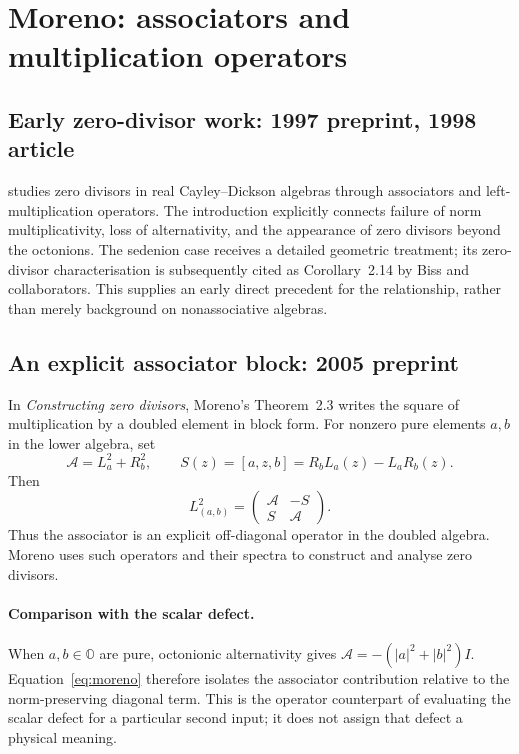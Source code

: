 \documentclass[11pt,a4paper]{article}
\newcommand{\OO}{\mathbb O}
\numberwithin{equation}{section}
\begin{document}
\section{Moreno: associators and multiplication operators}

\subsection{Early zero-divisor work: 1997 preprint, 1998 article}

\citet{Moreno1998ZeroDivisors} studies zero divisors in real
Cayley--Dickson algebras through associators and left-multiplication
operators. The introduction explicitly connects failure of norm
multiplicativity, loss of alternativity, and the appearance of zero
divisors beyond the octonions. The sedenion case receives a detailed
geometric treatment; its zero-divisor characterisation is subsequently
cited as Corollary~2.14 by Biss and collaborators.
This supplies an early direct precedent for the relationship, rather
than merely background on nonassociative algebras.
\citep{Moreno1998ZeroDivisors,BissDuggerIsaksen2008Annihilators}

\subsection{An explicit associator block: 2005 preprint}

In \emph{Constructing zero divisors}, Moreno's Theorem~2.3 writes the
square of multiplication by a doubled element in block form. For
nonzero pure elements $a,b$ in the lower algebra, set
\begin{equation}
 \mathcal A=L_a^2+R_b^2,\qquad
 S(z)=[a,z,b]=R_bL_a(z)-L_aR_b(z).
\end{equation}
Then
\begin{equation}
 L_{(a,b)}^2=
 \begin{pmatrix}\mathcal A&-S\\S&\mathcal A\end{pmatrix}.
 \label{eq:moreno}
\end{equation}
Thus the associator is an explicit off-diagonal operator in the doubled
algebra. Moreno uses such operators and their spectra to construct and
analyse zero divisors.~\citep[Sec.~2, Theorem~2.3; Sec.~3]{Moreno2005Constructing}

\paragraph{Comparison with the scalar defect.}
When $a,b\in\OO$ are pure, octonionic alternativity gives
$\mathcal A=-(|a|^2+|b|^2)I$.
Equation~\eqref{eq:moreno} therefore isolates the associator contribution
relative to the norm-preserving diagonal term. This is the operator
counterpart of evaluating the scalar defect for a particular second
input; it does not assign that defect a physical meaning.
\end{document}
